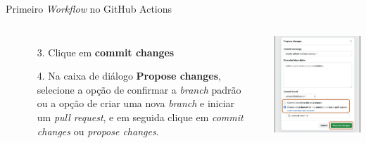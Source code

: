 \documentclass[t,serif]{beamer}
\begin{document}
	\begin{frame}{Primeiro \textit{Workflow} no GitHub Actions}
		\begin{columns}
				\\
				\begin{enumerate}
					\item[3.] Clique em \textbf{commit changes}
					\item[4.] Na caixa de diálogo \textbf{Propose changes}, selecione a opção de confirmar a \textit{branch} padrão ou a opção de criar uma nova \textit{branch} e iniciar um \textit{pull request}, e em seguida clique em \textit{commit changes} ou \textit{propose changes}.
				\end{enumerate}
				\\
				\begin{center}
					\includegraphics[width=\linewidth]{figs/3_5.png}
				\end{center}
		\end{columns}
	\end{frame}
	
\end{document}
